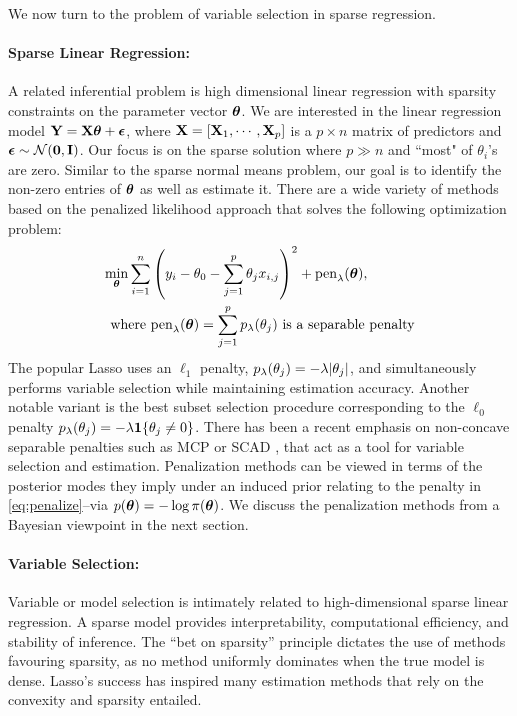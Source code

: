 \documentclass[11pt]{article}
\begin{document}
We now turn to the problem of variable selection in sparse regression. 

\paragraph{Sparse Linear Regression:} A related inferential problem is high
dimensional linear regression with sparsity constraints on the parameter vector
$\boldsymbol{\theta}$. We are interested in the linear regression model ${\bf Y} = {\bf X} \boldsymbol{\theta} +
\boldsymbol{\epsilon}$, where ${\bf X} = [{\bf X}_1, \cdots, {\bf X}_p]$ is a $p \times n$ matrix of
predictors and $\boldsymbol{\epsilon} \sim {\cal N}({\bf 0}, {\bf I})$. Our focus is on the sparse
solution where $p \gg n$ and ``most" of $\theta_i$'s are zero.  Similar to the
sparse normal means problem, our goal is to identify the non-zero entries of
$\boldsymbol{\theta}$ as well as estimate it. There are a wide variety of methods based on
the penalized likelihood approach that solves the following optimization
problem:
\begin{align}
  \min_{\boldsymbol{\theta}} \sum_{i=1}^{n} &  \left( y_i - \theta_0 - \sum_{j=1}^{p} \theta_j x_{i,j} \right)^2 + \text{pen}_{\lambda}(\boldsymbol{\theta}), \label{eq:penalize} \\
  \text{where } & \text{pen}_{\lambda}(\boldsymbol{\theta}) = \sum_{j=1}^{p} p_{\lambda}(\theta_j) \text{ is a separable penalty} \nonumber
\end{align}
The popular Lasso uses an $\ell_1$ penalty,
$p_{\lambda}(\theta_j) = -\lambda \lvert\theta_j\rvert$, and simultaneously
performs variable selection while maintaining estimation accuracy.  Another
notable variant is the best subset selection procedure corresponding to the
$\ell_0$ penalty $p_{\lambda}(\theta_j) = -\lambda {\bf 1}\{\theta_j \ne 0\}$.
There has been a recent emphasis on non-concave separable penalties such as
MCP \citep{zhang2010nearly} or SCAD \citep{fan2001variable}, that act as
a tool for variable selection and estimation. Penalization methods can be
viewed in terms of the posterior modes they imply under an induced prior
relating to the penalty in \eqref{eq:penalize}--via $p(\boldsymbol{\theta}) = -\log
\pi(\boldsymbol{\theta})$. We discuss the penalization methods from a Bayesian viewpoint in
the next section. 

\paragraph{Variable Selection:} Variable or model selection is intimately
related to high-dimensional sparse linear regression.  A sparse model provides
interpretability, computational efficiency, and stability of inference.  The
``bet on sparsity'' principle \citep{hastie09} dictates the use of methods
favouring sparsity, as no method uniformly dominates when the true model is
dense.  Lasso's success has inspired many estimation methods that rely on
the convexity and sparsity entailed. 
\end{document}
